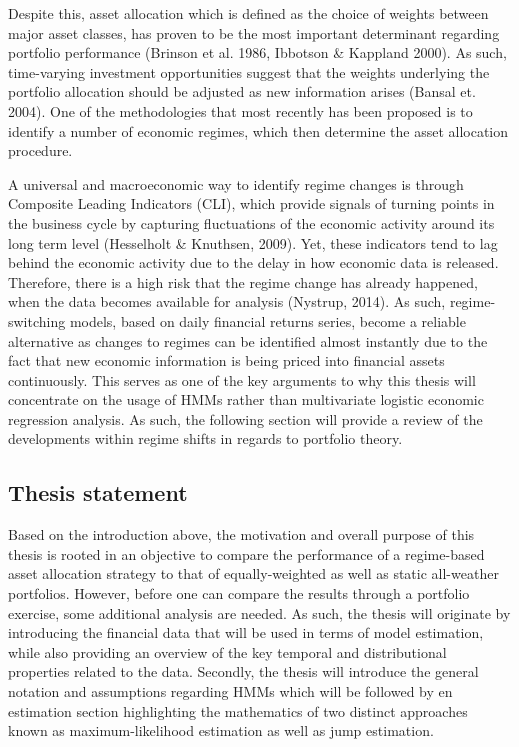 Despite this, asset allocation which is defined as the choice of weights between major asset classes, has proven to be the most important determinant regarding portfolio performance (Brinson et al. 1986, Ibbotson \& Kappland 2000). As such, time-varying investment opportunities suggest that the weights underlying the portfolio allocation should be adjusted as new information arises (Bansal et. 2004). One of the methodologies that most recently has been proposed is to identify a number of economic regimes, which then determine the asset allocation procedure. 

A universal and macroeconomic way to identify regime changes is through Composite Leading Indicators (CLI), which provide signals of turning points in the business cycle by capturing fluctuations of the economic activity around its long term level (Hesselholt \& Knuthsen, 2009). Yet, these indicators tend to lag behind the economic activity due to the delay in how economic data is released. Therefore, there is a high risk that the regime change has already happened, when the data becomes available for analysis (Nystrup, 2014). As such, regime-switching models, based on daily financial returns series, become a reliable alternative as changes to regimes can be identified almost instantly due to the fact that new economic information is being priced into financial assets continuously. This serves as one of the key arguments to why this thesis will concentrate on the usage of HMMs rather than multivariate logistic economic regression analysis. As such, the following section will provide a review of the developments within regime shifts in regards to portfolio theory.

\subsection{Thesis statement}
Based on the introduction above, the motivation and overall purpose of this thesis is rooted in an objective to compare the performance of a regime-based asset allocation strategy to that of equally-weighted as well as static all-weather portfolios. However, before one can compare the results through a portfolio exercise, some additional analysis are needed. As such, the thesis will originate by introducing the financial data that will be used in terms of model estimation, while also providing an overview of the key temporal and distributional properties related to the data. Secondly, the thesis will introduce the general notation and assumptions regarding HMMs which will be followed by en estimation section highlighting the mathematics of two distinct approaches known as maximum-likelihood estimation as well as jump estimation. 

